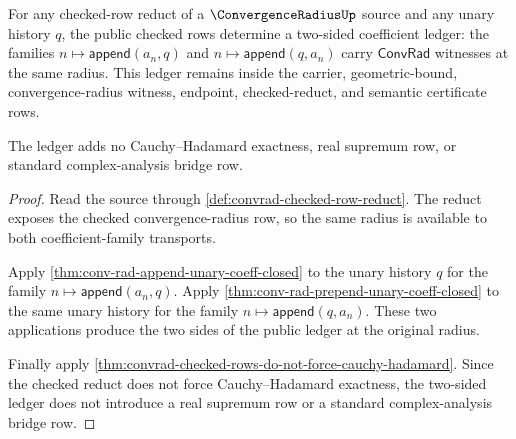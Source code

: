 \begin{theorem}
\label{thm:convergence-radius-checked-row-two-sided-ledger-boundary}
For any checked-row reduct of a $\ConvergenceRadiusUp$ source and any unary
history $q$, the public checked rows determine a two-sided coefficient ledger:
the families $n \mapsto \mathsf{append}(a_n,q)$ and
$n \mapsto \mathsf{append}(q,a_n)$ carry $\mathsf{ConvRad}$ witnesses at the
same radius. This ledger remains inside the carrier, geometric-bound,
convergence-radius witness, endpoint, checked-reduct, and semantic certificate
rows.

The ledger adds no Cauchy--Hadamard exactness, real supremum row, or standard
complex-analysis bridge row.
\end{theorem}
\begin{proof}
Read the source through \autoref{def:convrad-checked-row-reduct}. The reduct
exposes the checked convergence-radius row, so the same radius is available to
both coefficient-family transports.

Apply \autoref{thm:conv-rad-append-unary-coeff-closed} to the unary history
$q$ for the family $n \mapsto \mathsf{append}(a_n,q)$. Apply
\autoref{thm:conv-rad-prepend-unary-coeff-closed} to the same unary history
for the family $n \mapsto \mathsf{append}(q,a_n)$. These two applications
produce the two sides of the public ledger at the original radius.

Finally apply
\autoref{thm:convrad-checked-rows-do-not-force-cauchy-hadamard}. Since the
checked reduct does not force Cauchy--Hadamard exactness, the two-sided ledger
does not introduce a real supremum row or a standard complex-analysis bridge
row.
\end{proof}

